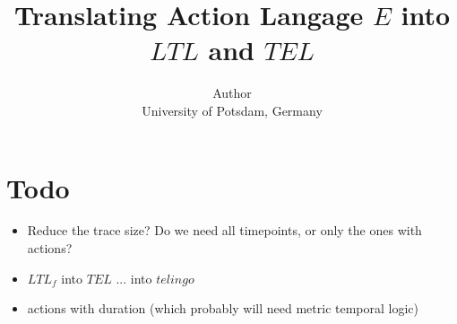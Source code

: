 \documentclass[a4paper]{article}
\begin{document}
\title{Translating Action Langage $E$ into $LTL$ and $TEL$}

\author{%
  Author\\
  University of Potsdam, Germany
}

\maketitle





%
%
%
%
%

\section{Todo}

\begin{itemize}
  \item Reduce the trace size? Do we need all timepoints, or only the ones with actions?
  \item $LTL_f$ into $TEL$ ... into $telingo$
  \item actions with duration (which probably will need metric temporal logic)
\end{itemize}

\printbibliography{}
\end{document}
